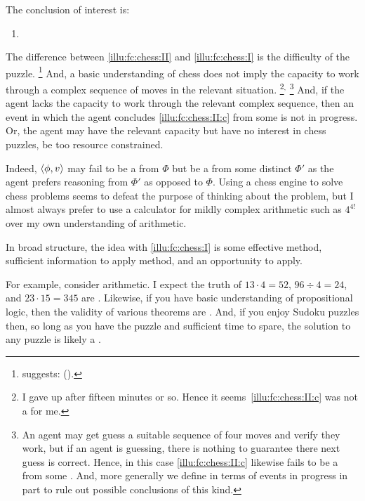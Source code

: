 \begin{note}[Chess II]
  \noindent%
  The conclusion of interest is:
  \begin{enumerate}[label=C\thescenarioCounter., ref=(C\thescenarioCounter)]
  \item
    \label{illu:fc:chess:II:c}
  \end{enumerate}
  The difference between \autoref{illu:fc:chess:II} and \autoref{illu:fc:chess:I} is the difficulty of the puzzle.%
  \footnote{
    \citeauthor{Emms:2000aa} suggests:
    (\citeyear[46]{Emms:2000aa}).
  }
  And, a basic understanding of chess does not imply the capacity to work through a complex sequence of moves in the relevant situation.%
  \footnote{
    I gave up after fifteen minutes or so.
    Hence it seems~\ref{illu:fc:chess:II:c} was not a \fc{} for me.
  }\(^{,}\)%
  \footnote{
    An agent may get guess a suitable sequence of four moves and verify they work, but if an agent is guessing, there is nothing to guarantee there next guess is correct.
    Hence, in this case \ref{illu:fc:chess:II:c} likewise fails to be a \fc{} from some \pool{}.
    And, more generally we define  in terms of events in progress in part to rule out possible conclusions of this kind.
  }
  And, if the agent lacks the capacity to work through the relevant complex sequence, then an event in which the agent concludes \ref{illu:fc:chess:II:c} from some \pool{} is not in progress.
  Or, the agent may have the relevant capacity but have no interest in chess puzzles, be too resource constrained.

  Indeed, \(\langle \phi, v \rangle\) may fail to be a \fc{} from \(\Phi\) but be a \fc{} from some distinct \pool{} \(\Phi'\) as the agent prefers reasoning from \(\Phi'\) as opposed to \(\Phi\).
  Using a chess engine to solve chess problems seems to defeat the purpose of thinking about the problem, but I almost always prefer to use a calculator for mildly complex arithmetic such as \(4^{4!}\) over my own understanding of arithmetic.
\end{note}


\begin{note}
  In broad structure, the idea with \autoref{illu:fc:chess:I} is some effective method, sufficient information to apply method, and an opportunity to apply.

  For example, consider arithmetic.
  I expect the truth of \(13 \cdot 4 = 52\), \(96 \div 4 = 24\), and \(23 \cdot 15 = 345\) are .
  Likewise, if you have basic understanding of propositional logic, then the validity of various theorems are .
  And, if you enjoy Sudoku puzzles then, so long as you have the puzzle and sufficient time to spare, the solution to any puzzle is likely a \fc{}.
\end{note}

